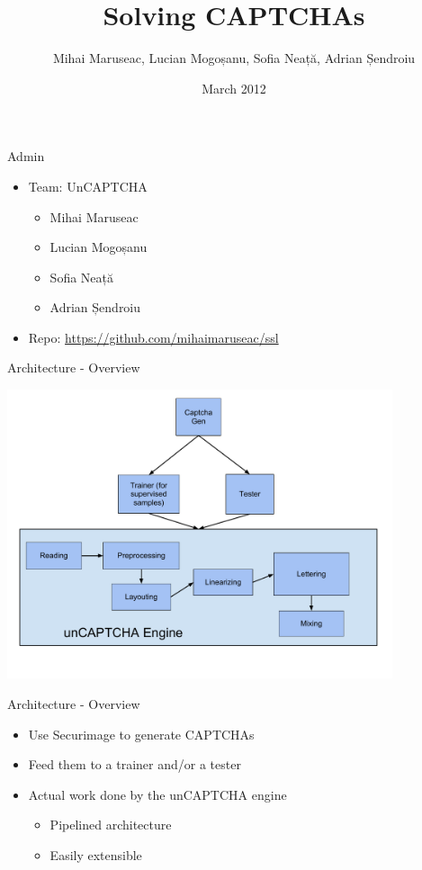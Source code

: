 \documentclass[red]{beamer}
\begin{document}
\title{Solving CAPTCHAs}
\author[MM, LM, SN, AS]{Mihai Maruseac, Lucian Mogoșanu, Sofia Neață, Adrian Șendroiu}
\date{March 2012}


\maketitle

\begin{frame}{Admin}
  \begin{itemize}
    \item Team: UnCAPTCHA
      \begin{itemize}
        \item Mihai Maruseac
        \item Lucian Mogoșanu
        \item Sofia Neață
        \item Adrian Șendroiu
      \end{itemize}
    \item Repo: \url{https://github.com/mihaimaruseac/ssl}
  \end{itemize}
\end{frame}

\begin{frame}{Architecture - Overview}
	\begin{center}
	\includegraphics[width=0.85\textwidth]{img/unCAPTCHAarchitecturedraft.pdf}
	\end{center}
\end{frame}

\begin{frame}{Architecture - Overview}
  \begin{itemize}
  	\item Use Securimage to generate CAPTCHAs
	\item Feed them to a trainer and/or a tester
	\item Actual work done by the unCAPTCHA engine
	\begin{itemize}
		\item Pipelined architecture
		\item Easily extensible
	\end{itemize}
  \end{itemize}
\end{frame}
\end{document}

